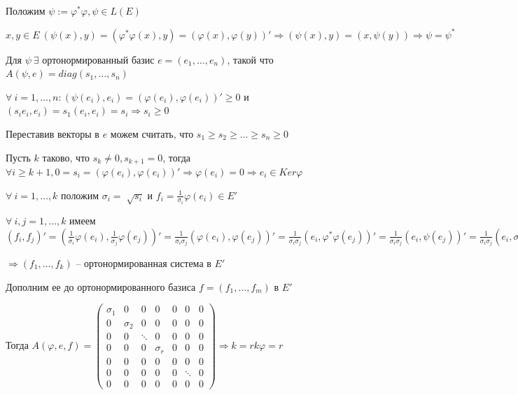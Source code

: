 \bigskip
Положим $\psi:= \varphi^* \varphi, \psi \in L(E)$

$x, y \in E \ (\psi(x), y) = (\varphi^* \varphi(x), y) = (\varphi(x), \varphi(y))' \Rightarrow (\psi(x), y) = (x, \psi(y)) \Rightarrow \psi = \psi^*$

\bigskip
Для $\psi \ \exists$ ортонормированный базис $e = (e_1, \dots, e_n)$, такой что $A(\psi, e) = diag(s_1, \dots, s_n)$

\bigskip
$\forall \ i = 1, \dots, n: (\psi(e_i), e_i) = (\varphi(e_i), \varphi(e_i))' \geqslant 0$ и $(s_i e_i, e_i) = s_1 (e_i, e_i) = s_i \Rightarrow s_i \geqslant 0$

\bigskip
Переставив векторы в $e$ можем считать, что $s_1 \geqslant s_2 \geqslant \dots \geqslant s_n \geqslant 0$

\bigskip
Пусть $k$ таково, что $s_k \neq 0, s_{k+1} = 0$, тогда $\forall i \geqslant k + 1, 0 = s_i = (\varphi(e_i), \varphi(e_i))' \Rightarrow \varphi(e_i) = 0 \Rightarrow e_i \in Ker \varphi$

\bigskip
$\forall \ i = 1, \dots, k$ положим $\sigma_i = \sqrt[]{s_i}$ и $f_i = \frac{1}{\sigma_i} \varphi(e_i) \in E'$

$\forall \ i, j = 1, \dots, k$ имеем $(f_i, f_j)' = (\frac{1}{\sigma_i} \varphi(e_i), \frac{1}{\sigma_j} \varphi(e_j))' = \frac{1}{\sigma_i \sigma_j}(\varphi(e_i), \varphi(e_j))' = \frac{1}{\sigma_i \sigma_j}(e_i, \varphi^* \varphi(e_j))' = \frac{1}{\sigma_i \sigma_j}(e_i, \psi(e_j))' = \frac{1}{\sigma_i \sigma_j}(e_i, \sigma_j^2 e_j)' = \frac{\sigma_j}{\sigma_i} (e_i, e_j) = \frac{\sigma_j}{\sigma_i} \delta_{ij} = \delta_{ij}$

$\Rightarrow (f_1, \dots, f_k)$ -- ортонормированная система в $E'$

\bigskip
Дополним ее до ортонормированного базиса $f = (f_1, \dots, f_m)$ в $E'$

Тогда $A(\varphi, e, f) = \begin{pmatrix} \sigma_1 & 0 & 0 & 0 & 0 & 0 & 0 \\  0 & \sigma_2 & 0 & 0 & 0 & 0 & 0 \\ 0 & 0 & \ddots & 0 & 0 & 0 & 0 \\ 0 & 0 & 0 & \sigma_r & 0 & 0 & 0 \\ 0 & 0 & 0 & 0 & 0 & 0 & 0 \\ 0 & 0 & 0 & 0 & 0 & \ddots & 0 \\ 0 & 0 & 0 & 0 & 0 & 0 & 0  \end{pmatrix} \Rightarrow k = rk \varphi = r$


